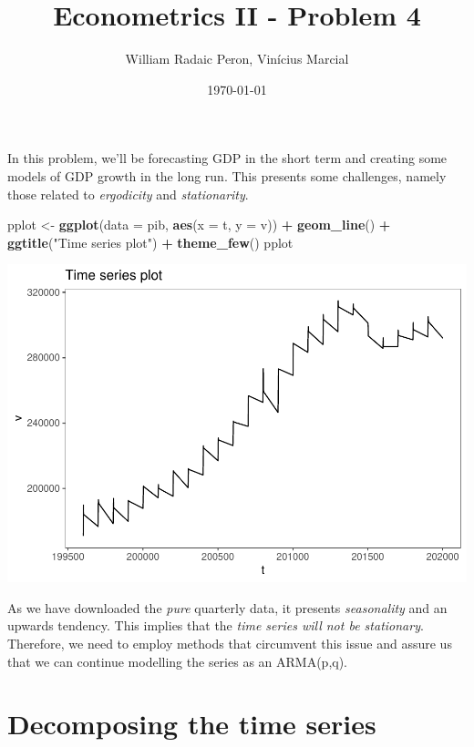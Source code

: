 \documentclass[]{article}
\title{Econometrics II - Problem 4}
\author{William Radaic Peron, Vinícius Marcial}
\date{\today}
\newenvironment{Shaded}{\begin{snugshade}}{\end{snugshade}}
\newcommand{\DataTypeTok}[1]{\textcolor[rgb]{0.13,0.29,0.53}{#1}}
\newcommand{\KeywordTok}[1]{\textcolor[rgb]{0.13,0.29,0.53}{\textbf{#1}}}
\newcommand{\NormalTok}[1]{#1}
\newcommand{\OperatorTok}[1]{\textcolor[rgb]{0.81,0.36,0.00}{\textbf{#1}}}
\newcommand{\StringTok}[1]{\textcolor[rgb]{0.31,0.60,0.02}{#1}}
\begin{document}
\maketitle

In this problem, we'll be forecasting GDP in the short term and creating
some models of GDP growth in the long run. This presents some
challenges, namely those related to \emph{ergodicity} and
\emph{stationarity}.

\begin{Shaded}
\begin{Highlighting}[]
\NormalTok{pplot <-}\StringTok{ }\KeywordTok{ggplot}\NormalTok{(}\DataTypeTok{data =}\NormalTok{ pib, }\KeywordTok{aes}\NormalTok{(}\DataTypeTok{x =}\NormalTok{ t, }\DataTypeTok{y =}\NormalTok{ v)) }\OperatorTok{+}\StringTok{ }\KeywordTok{geom_line}\NormalTok{() }\OperatorTok{+}\StringTok{ }\KeywordTok{ggtitle}\NormalTok{(}\StringTok{"Time series plot"}\NormalTok{) }\OperatorTok{+}\StringTok{ }\KeywordTok{theme_few}\NormalTok{()}
\NormalTok{pplot }
\end{Highlighting}
\end{Shaded}

\includegraphics{Econo2_P5_files/figure-latex/plots-1.pdf}

As we have downloaded the \emph{pure} quarterly data, it presents
\emph{seasonality} and an upwards tendency. This implies that the
\emph{time series will not be stationary}. Therefore, we need to employ
methods that circumvent this issue and assure us that we can continue
modelling the series as an ARMA(p,q).

\section{Decomposing the time series}
\end{document}
